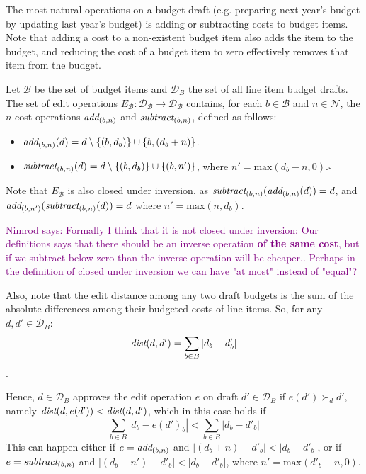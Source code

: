 \documentclass{llncs}
\newcommand{\nimrod}[1]{\textcolor{purple}{Nimrod says: #1}}
\newcommand{\qqed}{\hfill$\square$}
\newcommand{\calD}{\mathcal{D}}
\newcommand{\add}[1]{\emph{add}_{#1}}
\newcommand{\subtract}[1]{\emph{subtract}_{#1}}
\newcommand{\prefers}[1]{\succ_{#1}}
\newcommand{\dist}{\emph{dist}}
\newcommand{\calB}{\mathcal{B}}
\newcommand{\calN}{\mathcal{N}}
\begin{document}
The most natural operations on a budget draft (e.g. preparing next year's budget by updating last year's budget) is adding or subtracting costs to budget items. Note that adding a cost to a non-existent budget item also adds the item to the budget, and reducing the cost of a  budget item to zero effectively removes that item from the budget.

\begin{definition}
Let $\calB$ be the set of budget items and $\calD_B$ the set of all line item budget drafts. The set of edit operations $E_\calB: \calD_\calB \rightarrow \calD_\calB$ contains, for each $b \in \calB$ and $n \in \calN$, the $n$-cost operations $\add{(b,n)}$ and $\subtract{(b,n)}$, defined as follows: 
\begin{itemize}
    \item $\add{(b,n)}(d) = d \setminus \{(b,d_b)\} \cup \{b,(d_b+n)\}$.
    \item $\subtract{(b,n)}(d) = d \setminus \{(b,d_b)\} \cup \{(b,n')\}$, where $n' = \textrm{max}(d_b-n,0)$.\qqed
\end{itemize}
\end{definition}

Note that $E_\calB$ is also closed under inversion, as $\subtract{(b,n)}(\add{(b,n)}(d)) = d$, and $\add{(b,n')}(\subtract{(b,n)}(d)) = d$ where $n' = \textrm{max}(n,d_b)$.

\nimrod{Formally I think that it is not closed under inversion: Our definitions says that there should be an inverse operation \textbf{of the same cost}, but if we subtract below zero than the inverse operation will be cheaper.. Perhaps in the definition of closed under inversion we can have "at most" instead of "equal"?}

Also, note that the edit distance among any two draft budgets  is the sum of the absolute differences among their budgeted costs of line items.  So, for any  $d, d' \in \calD_B$:
$$
\dist(d,d') = \sum_{b \in B} |d_b - d'_b|  
$$.

Hence,
$d \in \calD_B$ approves the edit operation $e$ on draft $d' \in \calD_B$ if $e(d') \prefers{d} d'$, namely  $\dist(d, e(d')) < \dist(d, d')$, which in this case holds if
$$
\sum_{b \in B} |d_b - e(d')_b| <
\sum_{b \in B} |d_b - d'_b|
$$
 This can happen either if $e = \add{(b,n)}$ and 
 $|(d_b + n) - d'_b| < |d_b - d'_b|$, 
 or if 
 $e = \subtract{(b,n)}$   and
 $|(d_b - n') - d'_b| < |d_b - d'_b| $, 
 where $n' = \textrm{max}(d'_b - n, 0)$.
\end{document}
